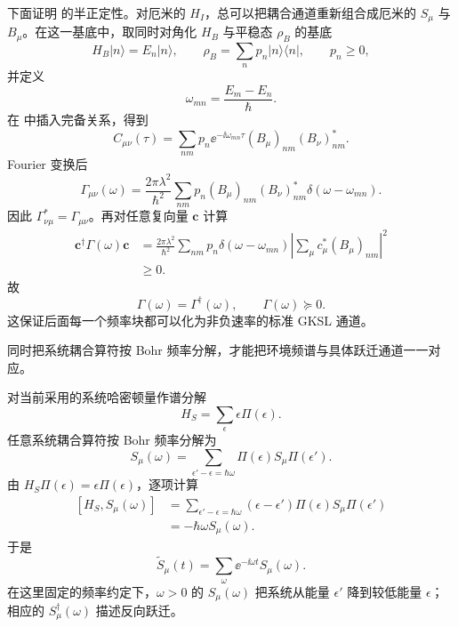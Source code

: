 下面证明 的半正定性。对厄米的 $H_I$，总可以把耦合通道重新组合成厄米的 $S_\mu$ 与 $B_\mu$。在这一基底中，取同时对角化 $H_B$ 与平稳态 $\rho_B$ 的基底
\[
H_B|n\rangle=E_n|n\rangle,
\qquad
\rho_B=\sum_np_n|n\rangle\langle n|,
\qquad
p_n\ge0,
\]
并定义
\[
\omega_{mn}=\frac{E_m-E_n}{\hbar}.
\]
在 中插入完备关系，得到
\[
C_{\mu\nu}(\tau)
=\sum_{nm}p_n
\ee^{-\ii\omega_{mn}\tau}
(B_\mu)_{nm}(B_\nu)_{nm}^*.
\]
Fourier 变换后
\begin{equation}
\Gamma_{\mu\nu}(\omega)
=\frac{2\pi\lambda^2}{\hbar^2}
\sum_{nm}p_n
(B_\mu)_{nm}(B_\nu)_{nm}^*
\delta(\omega-\omega_{mn}).
\label{eq:phys-oqs-gamma-spectral-representation}
\end{equation}
因此 $\Gamma_{\nu\mu}^*=\Gamma_{\mu\nu}$。再对任意复向量 $\mathbf c$ 计算
\[
\begin{aligned}
\mathbf c^\dagger\Gamma(\omega)\mathbf c
&=\frac{2\pi\lambda^2}{\hbar^2}
\sum_{nm}p_n\delta(\omega-\omega_{mn})
\left|\sum_\mu c_\mu^*(B_\mu)_{nm}\right|^2\\
&\ge0.
\end{aligned}
\]
故
\begin{equation}
\Gamma(\omega)=\Gamma^\dagger(\omega),
\qquad
\Gamma(\omega)\succeq0.
\label{eq:phys-oqs-gamma-psd}
\end{equation}
这保证后面每一个频率块都可以化为非负速率的标准 GKSL 通道。

同时把系统耦合算符按 Bohr 频率分解，才能把环境频谱与具体跃迁通道一一对应。

对当前采用的系统哈密顿量作谱分解
\[
H_S=\sum_\epsilon\epsilon\Pi(\epsilon).
\]
任意系统耦合算符按 Bohr 频率分解为
\begin{equation}
S_\mu(\omega)
=\sum_{\epsilon'-\epsilon=\hbar\omega}
\Pi(\epsilon)S_\mu\Pi(\epsilon').
\label{eq:phys-oqs-bohr-component}
\end{equation}
由 $H_S\Pi(\epsilon)=\epsilon\Pi(\epsilon)$，逐项计算
\[
\begin{aligned}
[H_S,S_\mu(\omega)]
&=\sum_{\epsilon'-\epsilon=\hbar\omega}
(\epsilon-\epsilon')
\Pi(\epsilon)S_\mu\Pi(\epsilon')\\
&=-\hbar\omega S_\mu(\omega).
\end{aligned}
\]
于是
\begin{equation}
\widetilde S_\mu(t)
=\sum_\omega
\ee^{-\ii\omega t}S_\mu(\omega).
\label{eq:phys-oqs-s-interaction-bohr}
\end{equation}
在这里固定的频率约定下，$\omega>0$ 的 $S_\mu(\omega)$ 把系统从能量 $\epsilon'$ 降到较低能量 $\epsilon$；相应的 $S_\mu^\dagger(\omega)$ 描述反向跃迁。


